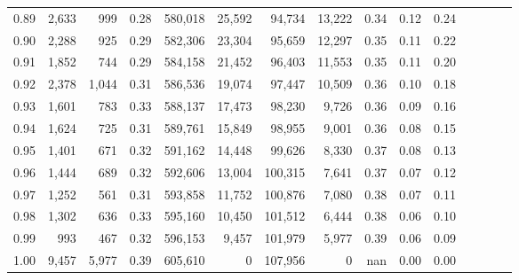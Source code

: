 \begin{tabular}{rrrcrrrrrrrrrrr}
0.89 &   2,633 &    999 &                                       0.28 &  580,018 &   25,592 &   94,734 &   13,222 &  0.34 &  0.12 &                         0.24 \\
0.90 &   2,288 &    925 &                                       0.29 &  582,306 &   23,304 &   95,659 &   12,297 &  0.35 &  0.11 &                         0.22 \\
0.91 &   1,852 &    744 &                                       0.29 &  584,158 &   21,452 &   96,403 &   11,553 &  0.35 &  0.11 &                         0.20 \\
0.92 &   2,378 &  1,044 &                                       0.31 &  586,536 &   19,074 &   97,447 &   10,509 &  0.36 &  0.10 &                         0.18 \\
0.93 &   1,601 &    783 &                                       0.33 &  588,137 &   17,473 &   98,230 &    9,726 &  0.36 &  0.09 &                         0.16 \\
0.94 &   1,624 &    725 &                                       0.31 &  589,761 &   15,849 &   98,955 &    9,001 &  0.36 &  0.08 &                         0.15 \\
0.95 &   1,401 &    671 &                                       0.32 &  591,162 &   14,448 &   99,626 &    8,330 &  0.37 &  0.08 &                         0.13 \\
0.96 &   1,444 &    689 &                                       0.32 &  592,606 &   13,004 &  100,315 &    7,641 &  0.37 &  0.07 &                         0.12 \\
0.97 &   1,252 &    561 &                                       0.31 &  593,858 &   11,752 &  100,876 &    7,080 &  0.38 &  0.07 &                         0.11 \\
0.98 &   1,302 &    636 &                                       0.33 &  595,160 &   10,450 &  101,512 &    6,444 &  0.38 &  0.06 &                         0.10 \\
0.99 &     993 &    467 &                                       0.32 &  596,153 &    9,457 &  101,979 &    5,977 &  0.39 &  0.06 &                         0.09 \\
1.00 &   9,457 &  5,977 &                                       0.39 &  605,610 &        0 &  107,956 &        0 &   nan &  0.00 &                         0.00 \\
\bottomrule
\end{tabular}
